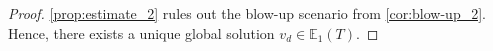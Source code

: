 \documentclass[preprint]{elsarticle}
\numberwithin{equation}{section}
\newcommand {\E}	{\mathbb{E}}
\renewcommand{\H}{\mathrm{H}}
\newcommand{\rL}{\mathrm{L}}
\newcommand{\rH}{\H}
\newcommand{\rB}{\mathrm{B}}
\newcommand{\rBrpq}[3]{\rB^{{#1}}_{{#2}{#3}}}
\begin{document}
\begin{proof}
	\autoref{prop:estimate_2} rules out the blow-up scenario from \autoref{cor:blow-up_2}. Hence, there exists a unique global solution $v_d \in \E_1(T)$.

\end{proof}
\end{document}
